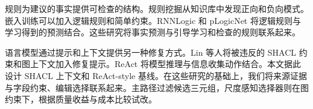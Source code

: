 规则为建议的事实提供可检查的结构。规则挖掘从知识库中发现正向和负向模式\citep{ref_galarraga2013,ref_ortona2018}。嵌入训练可以加入逻辑规则和简单约束\citep{ref_guo2016,ref_ding2018}。RNNLogic 和 pLogicNet 将逻辑规则与学习得到的预测结合\citep{ref_qu2021,ref_qu2019}。这些研究将事实预测与引导学习和检查的规则联系起来。

语言模型通过提示和上下文提供另一种修复方式。Lin 等人将被违反的 SHACL 约束和图上下文加入修复提示\citep{ref_lin2025}。ReAct 将模型推理与信息收集动作结合\citep{ref_yao2023react}。本文据此设计 SHACL 上下文和 ReAct-style 基线。在这些研究的基础上，我们将来源证据与字段约束、编辑选择联系起来。主路径过滤候选三元组，尺度感知选择器则在图约束下，根据质量收益与成本比较试改。